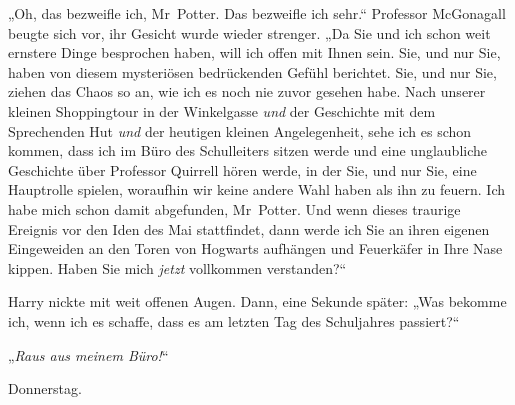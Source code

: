 „Oh, das bezweifle ich, Mr~Potter. Das bezweifle ich sehr.“ Professor McGonagall beugte sich vor, ihr Gesicht wurde wieder strenger. „Da Sie und ich schon weit ernstere Dinge besprochen haben, will ich offen mit Ihnen sein. Sie, und nur Sie, haben von diesem mysteriösen bedrückenden Gefühl berichtet. Sie, und nur Sie, ziehen das Chaos so an, wie ich es noch nie zuvor gesehen habe. Nach unserer kleinen Shoppingtour in der Winkelgasse \emph{und} der Geschichte mit dem Sprechenden Hut \emph{und} der heutigen kleinen Angelegenheit, sehe ich es schon kommen, dass ich im Büro des Schulleiters sitzen werde und eine unglaubliche Geschichte über Professor Quirrell hören werde, in der Sie, und nur Sie, eine Hauptrolle spielen, woraufhin wir keine andere Wahl haben als ihn zu feuern. Ich habe mich schon damit abgefunden, Mr~Potter. Und wenn dieses traurige Ereignis vor den Iden des Mai stattfindet, dann werde ich Sie an ihren eigenen Eingeweiden an den Toren von Hogwarts aufhängen und Feuerkäfer in Ihre Nase kippen. Haben Sie mich \emph{jetzt} vollkommen verstanden?“

Harry nickte mit weit offenen Augen. Dann, eine Sekunde später: „Was bekomme ich, wenn ich es schaffe, dass es am letzten Tag des Schuljahres passiert?“

„\emph{Raus aus meinem Büro!}“

\later

Donnerstag.

